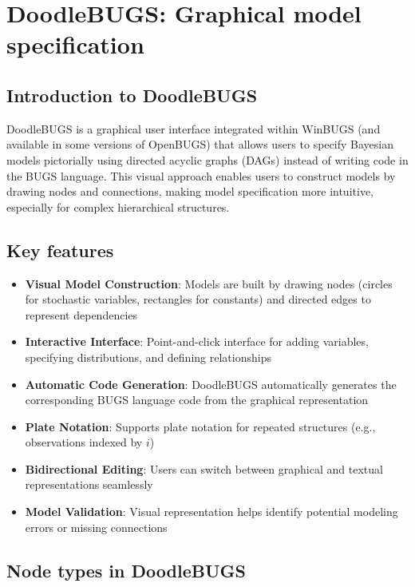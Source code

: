 \section{DoodleBUGS: Graphical model specification}

\subsection{Introduction to DoodleBUGS}

DoodleBUGS is a graphical user interface integrated within WinBUGS (and available in some versions of OpenBUGS) that allows users to specify Bayesian models pictorially using directed acyclic graphs (DAGs) instead of writing code in the BUGS language. This visual approach enables users to construct models by drawing nodes and connections, making model specification more intuitive, especially for complex hierarchical structures.

\subsection{Key features}

\begin{itemize}
    \item \textbf{Visual Model Construction}: Models are built by drawing nodes (circles for stochastic variables, rectangles for constants) and directed edges to represent dependencies
    \item \textbf{Interactive Interface}: Point-and-click interface for adding variables, specifying distributions, and defining relationships
    \item \textbf{Automatic Code Generation}: DoodleBUGS automatically generates the corresponding BUGS language code from the graphical representation
    \item \textbf{Plate Notation}: Supports plate notation for repeated structures (e.g., observations indexed by $i$)
    \item \textbf{Bidirectional Editing}: Users can switch between graphical and textual representations seamlessly
    \item \textbf{Model Validation}: Visual representation helps identify potential modeling errors or missing connections
\end{itemize}

\subsection{Node types in DoodleBUGS}

